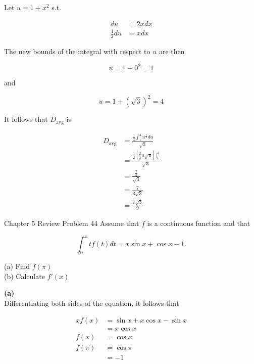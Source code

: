 \documentclass{article}
\begin{document}
    Let $u=1+x^2$ s.t.

    \begin{align*}
        du  &= 2xdx \\
        \frac{1}{2}du   &= xdx
    \end{align*}

    The new bounds of the integral with respect to $u$ are then

    \[
        u = 1+0^2 = 1
    \]

    and

    \[
        u = 1 + \left(\sqrt{3}\right)^2 = 4
    \]

    It follows that $D_{\text{avg}}$ is

    \begin{align*}
        D_{\text{avg}}  &= \frac{\frac{1}{2}\int_1^4 u^{\frac{1}{2}}du}{\sqrt{3}} \\
                        &= \frac{\frac{1}{2}\left[\frac{2}{3}u\sqrt{u}\right]\Big|_1^4}{\sqrt{3}} \\
                        &= \frac{\frac{7}{3}}{\sqrt{3}} \\
                        &= \frac{7}{3\sqrt{3}} \\
                        &= \frac{7\sqrt{3}}{9}
    \end{align*}

    \pagebreak
    \thispagestyle{6}


    \begin{tbhtheorem}{Chapter 5 Review Problem 44}
        Assume that $f$ is a continuous function and that

        \[
            \int_0^x tf(t)dt = x\sin{x} + \cos{x} - 1.
        \]

        (a) Find $f(\pi)$ \\
        (b) Calculate $f'(x)$
    \end{tbhtheorem}

    \textbf{(a)} \\
    Differentiating both sides of the equation, it follows that

    \begin{align*}
        xf(x)   &= \sin{x} + x\cos{x}-\sin{x} \\
                &= x\cos{x} \\
        f(x)    &= \cos{x} \\
        f(\pi)  &= \cos{\pi} \\
                &= -1
    \end{align*}
\end{document}
